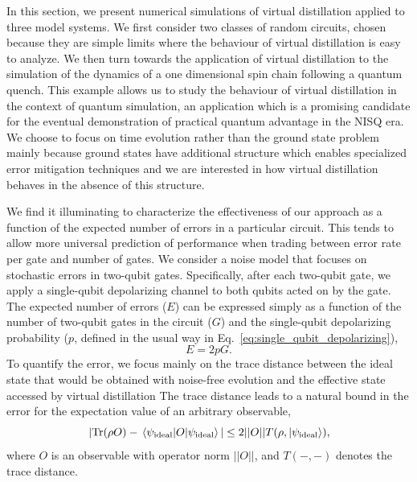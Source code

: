 \documentclass[
amsmath,
amssymb,
aps,
pra,
reprint,
twocolumn,
superscriptaddress,
longbibliography,
showkeys,
floatfix
]{revtex4-1}
\def\ket#1{\ensuremath{\mathinner{|{#1}\rangle}}}
\def\tr{\mathrm{Tr}}
\newcommand{\eq}[1]{Eq.~\hyperref[eq:#1]{\ref*{eq:#1}}}
\newcommand{\fig}[1]{\hyperref[fig:#1]{Figure~\ref*{fig:#1}}}
\begin{document}
In this section, we present numerical simulations of virtual distillation
applied to three model systems. 
We first consider two classes of random circuits, chosen because they are simple limits where the behaviour of virtual distillation is easy to analyze.
We then turn towards the application of virtual distillation to the simulation of the
dynamics of a one dimensional spin chain following a quantum quench. 
This example allows us to study the behaviour of virtual distillation in the context of quantum simulation, an application which is a promising candidate for the eventual demonstration of practical quantum advantage in the NISQ era. 
We choose to focus on time evolution rather than the ground state problem mainly because ground states have additional structure which enables specialized error mitigation techniques and we are interested in how virtual distillation behaves in the absence of this structure.

We find it illuminating to characterize the effectiveness of our approach as a
function of the expected number of errors in a particular circuit.
This tends to allow more universal prediction of performance when trading
between error rate per gate and number of gates.
We consider a noise model that focuses on stochastic errors in two-qubit gates. 
Specifically, after each two-qubit gate, we apply a single-qubit depolarizing
channel to both qubits acted on by the gate.
The expected number of errors (\(E\)) can be expressed simply as a function of
the number of two-qubit gates in the circuit (\(G\)) and the single-qubit
depolarizing probability (\(p\), defined in the usual way in
\eq{single_qubit_depolarizing}),
\begin{equation}
  \label{eq:expected_num_errors_depolarizing}
    E = 2pG.
\end{equation}
To quantify the error, we focus mainly on the trace distance between the ideal
state that would be obtained with noise-free evolution and the effective state
accessed by virtual distillation
The trace distance leads to a natural bound in the error for the expectation
value of an arbitrary observable,
\begin{equation}
  \label{eq:trace_distance_bound}
  |\tr(\rho O) - \ev{O}{\psi_{\mathrm{ideal}}}| \leq 2 || O || T(\rho, \ket{\psi_{\mathrm{ideal}}}),
\end{equation}
where \(O\) is an observable with operator norm \(||O||\), and \(T(-, -)\) denotes
the trace distance.
\end{document}
